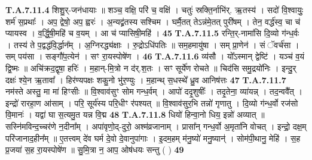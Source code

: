\documentclass[17pt]{extarticle}
\begin{document}
                  \newline
                                                                  \textbf{ T.A.7.11.4} \newline
                  शिशु॒र्-जन॑धायाः ॥ शञ्च॒ वक्षि॒ परि॑ च॒ वक्षि॑ ।  चतुः॑ स्रक्ति॒र्नाभि॑र्. ऋ॒तस्य॑ । सदो॑ वि॒श्वायुः॒ शर्म॑ स॒प्रथाः᳚ । अप॒ द्वेषो॒ अप॒ ह्वरः॑ । अ॒न्यद्व्र॑तस्य सश्चिम । घर्मै॒तत् तेऽन्न॑मे॒तत् पुरी॑षम् । तेन॒ वर्द्ध॑स्व॒ चा च॑ प्यायस्व । व॒र्द्धि॒षी॒महि॑ च व॒यम् । आ च॑ प्यासिषी॒महि॑ । \textbf{ 45} \newline
                  \newline
                                                                  \textbf{ T.A.7.11.5} \newline
                  रन्ति॒र्-नामा॑सि दि॒व्यो ग॑न्ध॒र्वः । तस्य॑ ते प॒द्वद्ध॑वि॒र्द्धान᳚म् । अ॒ग्निरद्ध्य॑क्षाः । रु॒द्रोऽधि॑पतिः ॥ सम॒हमायु॑षा । सम् प्रा॒णेन॑ ।  सं ॅवर्च॑सा । सम् पय॑सा । सङ्गौ॑प॒त्येन॑ । सꣳ रा॒यस्पोषे॑ण । \textbf{ 46} \newline
                  \newline
                                                                  \textbf{ T.A.7.11.6} \newline
                  व्य॑सौ । यो᳚ऽस्मान् द्वेष्टि॑ । यञ्च॑ व॒यं द्वि॒ष्मः ॥  अचि॑क्रद॒द्वृषा॒ हरिः॑ । म॒हान्-मि॒त्रो न द॑र्.श॒तः । सꣳ सूर्ये॑ण रोचते ॥ चिद॑सि समु॒द्रयो॑निः । इन्दु॒र् दक्षः॑ श्ये॒न ऋ॒तावा᳚ । हिर॑ण्यपक्षः शकु॒नो भु॑र॒ण्युः । म॒हान्थ् स॒धस्थे᳚ ध्रु॒व आनिष॑त्तः \textbf{ 47} \newline
                  \newline
                                                                  \textbf{ T.A.7.11.7} \newline
                  नम॑स्ते अस्तु॒ मा मा॑ हिꣳसीः ॥ वि॒श्वाव॑सुꣳ सोम गन्ध॒र्वम् । आपो॑ ददृ॒शुषीः᳚ । तदृ॒तेना॒ व्या॑यन्न् । तद॒न्ववै᳚त् । इन्द्रो॑ रारहा॒ण आ॑साम् । परि॒ सूर्य॑स्य परि॒धीꣳ र॑पश्यत् ॥ वि॒श्वाव॑सुर॒भि तन्नो॑ गृणातु । दि॒व्यो ग॑न्ध॒र्वो रज॑सो वि॒मानः॑ ।  यद्वा॑ घा स॒त्यमु॒त यन्न वि॒द्म \textbf{ 48} \newline
                  \newline
                                                                  \textbf{ T.A.7.11.8} \newline
                  धियो॑ हिन्वा॒नो धिय॒ इन्नो॑ अव्यात् ॥ सस्नि॑मविन्द॒च्चर॑णे न॒दीना᳚म् ।  अपा॑वृणो॒द्-दुरो॒ अश्म॑व्रजानाम् । प्रासा᳚न् गन्ध॒र्वो अ॒मृता॑नि वोचत् । इन्द्रो॒ दक्ष॒म् परि॑जानाद॒हीन᳚म् ॥ ए॒तत्त्वम् दे॑व घर्म दे॒वो दे॒वानुपा॑गाः ।  इ॒दम॒हम् म॑नु॒ष्यो॑ मनु॒ष्यान्॑ । सोम॑पी॒थानु॒ मेहि॑ । स॒ह प्र॒जया॑ स॒ह रा॒यस्पोषे॑ण ॥  सु॒मि॒त्रा न॒ आप॒ ओष॑धयः सन्तु ( ) \textbf{ 49} \newline
\end{document}

